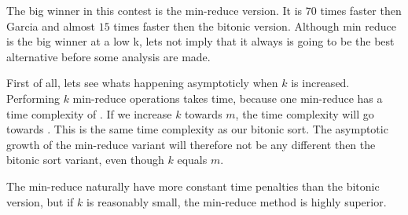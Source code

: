 The big winner in this contest is the min-reduce version. It is $70$ times faster then Garcia and almost $15$ times faster then the bitonic version. Although min reduce is the big winner at a low k, lets not imply that it always is going to be the best alternative before some analysis are made.

First of all, lets see whats happening asymptoticly when $k$ is increased.  Performing $k$ min-reduce operations takes  time, because one min-reduce has a time complexity of . If we increase $k$ towards $m$, the time complexity will go towards . This is the same time complexity as our bitonic sort. The asymptotic growth of the min-reduce variant will therefore not be any different then the bitonic sort variant, even though $k$ equals $m$. 


The min-reduce naturally have more constant time penalties than the bitonic version, but if $k$ is reasonably small, the min-reduce method is highly superior.   




